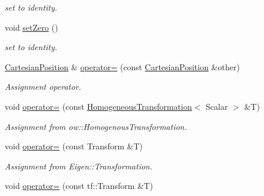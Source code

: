 \begin{DoxyCompactItemize}
\begin{DoxyCompactList}\small\item\em set to identity. \end{DoxyCompactList}\item 
void \hyperlink{classow__core_1_1CartesianPosition_ad73364e6a517bf223a17bdc963f66a06}{set\+Zero} ()\hypertarget{classow__core_1_1CartesianPosition_ad73364e6a517bf223a17bdc963f66a06}{}\label{classow__core_1_1CartesianPosition_ad73364e6a517bf223a17bdc963f66a06}

\begin{DoxyCompactList}\small\item\em set to identity. \end{DoxyCompactList}\item 
\hyperlink{classow__core_1_1CartesianPosition}{Cartesian\+Position} \& \hyperlink{classow__core_1_1CartesianPosition_a3f15db88fcb819eebe716f84b6443558}{operator=} (const \hyperlink{classow__core_1_1CartesianPosition}{Cartesian\+Position} \&other)\hypertarget{classow__core_1_1CartesianPosition_a3f15db88fcb819eebe716f84b6443558}{}\label{classow__core_1_1CartesianPosition_a3f15db88fcb819eebe716f84b6443558}

\begin{DoxyCompactList}\small\item\em Assignment operator. \end{DoxyCompactList}\item 
void \hyperlink{classow__core_1_1CartesianPosition_ac1e580eade44a33cf49e7416b49000fe}{operator=} (const \hyperlink{classow__core_1_1HomogeneousTransformation}{Homogeneous\+Transformation}$<$ Scalar $>$ \&T)\hypertarget{classow__core_1_1CartesianPosition_ac1e580eade44a33cf49e7416b49000fe}{}\label{classow__core_1_1CartesianPosition_ac1e580eade44a33cf49e7416b49000fe}

\begin{DoxyCompactList}\small\item\em Assignment from ow\+::\+Homogenous\+Transformation. \end{DoxyCompactList}\item 
void \hyperlink{classow__core_1_1CartesianPosition_a94bca79bf37ef9a5ddab1c157bd112ce}{operator=} (const Transform \&T)\hypertarget{classow__core_1_1CartesianPosition_a94bca79bf37ef9a5ddab1c157bd112ce}{}\label{classow__core_1_1CartesianPosition_a94bca79bf37ef9a5ddab1c157bd112ce}

\begin{DoxyCompactList}\small\item\em Assignment from Eigen\+::\+Transformation. \end{DoxyCompactList}\item 
void \hyperlink{classow__core_1_1CartesianPosition_a1384221faaf7c96e225f2cf918e55dab}{operator=} (const tf\+::\+Transform \&T)\hypertarget{classow__core_1_1CartesianPosition_a1384221faaf7c96e225f2cf918e55dab}{}\label{classow__core_1_1CartesianPosition_a1384221faaf7c96e225f2cf918e55dab}


\end{DoxyCompactItemize}
